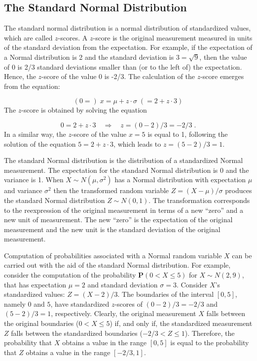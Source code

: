 \documentclass[]{krantz}
\newcommand{\Prob}{\mathbf{P}}
\theoremstyle{definition}
\theoremstyle{definition}
\theoremstyle{definition}
\theoremstyle{remark}
\begin{document}
\hypertarget{the-standard-normal-distribution}{%
\subsection{The Standard Normal Distribution}\label{the-standard-normal-distribution}}

The standard normal distribution is a normal distribution of
standardized values, which are called \(z\)-scores. A \(z\)-score is the
original measurement measured in units of the standard deviation from
the expectation. For example, if the expectation of a Normal
distribution is 2 and the standard deviation is \(3 = \sqrt{9}\), then the
value of 0 is 2/3 standard deviations smaller than (or to the left of)
the expectation. Hence, the \(z\)-score of the value 0 is -2/3. The
calculation of the \(z\)-score emerges from the equation:

\[(0 =)\; x = \mu + z \cdot \sigma\; (= 2 + z \cdot 3)\] The \(z\)-score
is obtained by solving the equation

\[0 = 2 + z \cdot 3 \quad \Longrightarrow \quad z = (0-2)/3 = -2/3\;.\]
In a similar way, the \(z\)-score of the value \(x = 5\) is equal to 1,
following the solution of the equation \(5 = 2 + z\cdot 3\), which leads
to \(z = (5-2)/3 = 1\).

The standard Normal distribution is the distribution of a standardized
Normal measurement. The expectation for the standard Normal distribution
is 0 and the variance is 1. When \(X \sim N(\mu,\sigma^2)\) has a Normal
distribution with expectation \(\mu\) and variance \(\sigma^2\) then the
transformed random variable \(Z = (X-\mu)/\sigma\) produces the standard
Normal distribution \(Z\sim N(0,1)\). The transformation corresponds to
the reexpression of the original measurement in terms of a new ``zero''
and a new unit of measurement. The new ``zero'' is the expectation of the
original measurement and the new unit is the standard deviation of the
original measurement.

Computation of probabilities associated with a Normal random variable
\(X\) can be carried out with the aid of the standard Normal distribution.
For example, consider the computation of the probability
\(\Prob(0 < X \leq 5)\) for \(X \sim N(2, 9)\), that has expectation \(\mu=2\)
and standard deviation \(\sigma = 3\). Consider \(X\)'s standardized values:
\(Z = (X-2)/3\). The boundaries of the interval \([0,5]\), namely \(0\) and
\(5\), have standardized \(z\)-scores of \((0-2)/3=-2/3\) and \((5-2)/3 =1\),
respectively. Clearly, the original measurement \(X\) falls between the
original boundaries (\(0 < X \leq 5\)) if, and only if, the standardized
measurement \(Z\) falls between the standardized boundaries
(\(-2/3 < Z \leq 1\)). Therefore, the probability that \(X\) obtains a value
in the range \([0,5]\) is equal to the probability that \(Z\) obtains a
value in the range \([-2/3,1]\).
\end{document}
